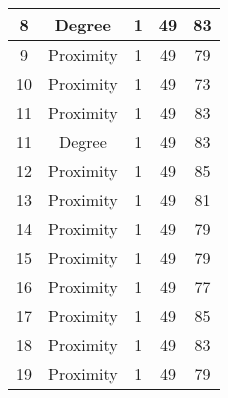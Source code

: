 \documentclass[results.tex]{subfiles}
\begin{document}
\begin{center}
\begin{tabular}{| c || c | c | c | c |}
            \hline
            8                       & Degree                       & 1                      & 49                      & 83                   \\
            \hline
            9                       & Proximity                    & 1                      & 49                      & 79                   \\
            \hline
            10                      & Proximity                    & 1                      & 49                      & 73                   \\
            \hline
            11                      & Proximity                    & 1                      & 49                      & 83                   \\
            \hline
            11                      & Degree                       & 1                      & 49                      & 83                   \\
            \hline
            12                      & Proximity                    & 1                      & 49                      & 85                   \\
            \hline
            13                      & Proximity                    & 1                      & 49                      & 81                   \\
            \hline
            14                      & Proximity                    & 1                      & 49                      & 79                   \\
            \hline
            15                      & Proximity                    & 1                      & 49                      & 79                   \\
            \hline
            16                      & Proximity                    & 1                      & 49                      & 77                   \\
            \hline
            17                      & Proximity                    & 1                      & 49                      & 85                   \\
            \hline
            18                      & Proximity                    & 1                      & 49                      & 83                   \\
            \hline
            19                      & Proximity                    & 1                      & 49                      & 79                   \\

\end{tabular}
\end{center}
\end{document}

